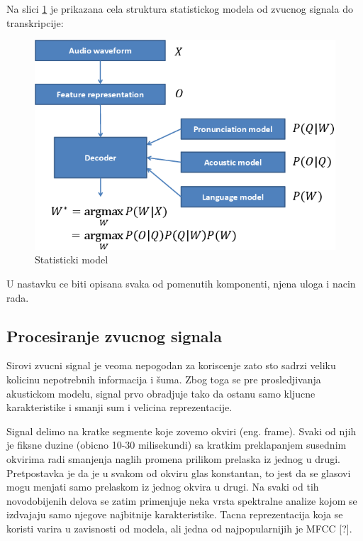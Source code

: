 \documentclass[a4paper]{article}
\begin{document}
Na slici \ref{fig:statistical_model} je prikazana cela struktura statistickog modela od zvucnog signala do transkripcije:
\begin{figure}[h!]
  \begin{center}
    \includegraphics[scale=0.4]{statistical_model.png}
  \end{center}
  \caption{Statisticki model}
  \label{fig:statistical_model}
\end{figure}
U nastavku ce biti opisana svaka od pomenutih komponenti, njena uloga i nacin rada.

\subsection{Procesiranje zvucnog signala}
Sirovi zvucni signal je veoma nepogodan za koriscenje zato sto sadrzi veliku kolicinu nepotrebnih informacija i šuma.
Zbog toga se pre prosledjivanja akustickom modelu, signal prvo obradjuje tako da ostanu samo kljucne karakteristike i smanji sum i velicina reprezentacije.

Signal delimo na kratke segmente koje zovemo okviri (eng. frame).
Svaki od njih je fiksne duzine (obicno 10-30 milisekundi) sa kratkim preklapanjem susednim okvirima radi smanjenja naglih promena prilikom prelaska iz jednog u drugi.
Pretpostavka je da je u svakom od okviru glas konstantan, to jest da se glasovi mogu menjati samo prelaskom iz jednog okvira u drugi.
Na svaki od tih novodobijenih delova se zatim primenjuje neka vrsta spektralne analize kojom se izdvajaju samo njegove najbitnije karakteristike.
Tacna reprezentacija koja se koristi varira u zavisnosti od modela, ali jedna od najpopularnijih je MFCC [?].
\end{document}
